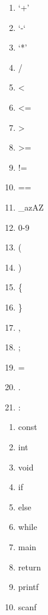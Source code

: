 \documentclass[letterpaper,10pt,english]{sphinxmanual}
\begin{document}
\begin{enumerate}
\item {} 
‘+’

\item {} 
‘-‘

\item {} 
‘*’

\item {} 
/

\item {} 
\textless{}

\item {} 
\textless{}=

\item {} 
\textgreater{}

\item {} 
\textgreater{}=

\item {} 
!=

\item {} 
==

\item {} 
\_azAZ

\item {} 
0-9

\item {} 
(

\item {} 
)

\item {} 
\{

\item {} 
\}

\item {} 
,

\item {} 
;

\item {} 
=

\item {} 
.

\item {} 
:

\end{enumerate}

\begin{enumerate}
\item {} 
const

\item {} 
int

\item {} 
void

\item {} 
if

\item {} 
else

\item {} 
while

\item {} 
main

\item {} 
return

\item {} 
printf

\item {} 
scanf

\end{enumerate}
\end{document}
